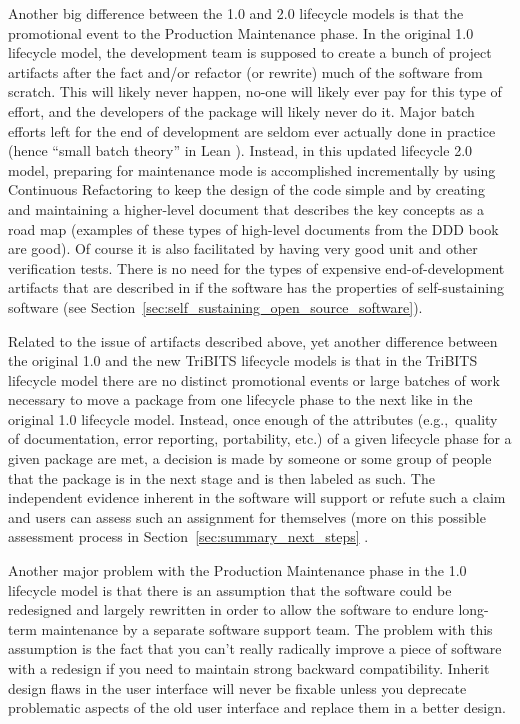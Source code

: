 \documentclass[11pt]{SANDreport}
\begin{document}
Another big difference between the 1.0 and 2.0 lifecycle models is
that the promotional event to the Production Maintenance phase.  In
the original 1.0 lifecycle model, the development team is supposed to
create a bunch of project artifacts after the fact and/or refactor (or
rewrite) much of the software from scratch.  This will likely never
happen, no-one will likely ever pay for this type of effort, and the
developers of the package will likely never do it.  Major batch
efforts left for the end of development are seldom ever actually done
in practice (hence ``small batch theory'' in Lean
{}\cite{ImplementingLeanSoftwareDevelopment}).  Instead, in this
updated lifecycle 2.0 model, preparing for maintenance mode is
accomplished incrementally by using Continuous Refactoring to keep
the design of the code simple and by creating and maintaining a
higher-level document that describes the key concepts as a road map
(examples of these types of high-level documents from the DDD book are
good).  Of course it is also facilitated by having very good unit and
other verification tests.  There is no need for the types of expensive
end-of-development artifacts that are described in
{}\cite{TrilinosLifecycleModel2007} if the software has the properties
of self-sustaining software (see
Section~\ref{sec:self_sustaining_open_source_software}).

Related to the issue of artifacts described above, yet another
difference between the original 1.0 and the new TriBITS lifecycle
models is that in the TriBITS lifecycle model there are no distinct
promotional events or large batches of work necessary to move a
package from one lifecycle phase to the next like in the original 1.0
lifecycle model.  Instead, once enough of the attributes (e.g.,\
quality of documentation, error reporting, portability, etc.) of a
given lifecycle phase for a given package are met, a decision is made
by someone or some group of people that the package is in the next
stage and is then labeled as such.  The independent evidence inherent
in the software will support or refute such a claim and users can
assess such an assignment for themselves (more on this possible
assessment process in Section~\ref{sec:summary_next_steps} .

Another major problem with the Production Maintenance phase in the 1.0
lifecycle model is that there is an assumption that the software could
be redesigned and largely rewritten in order to allow the software to
endure long-term maintenance by a separate software support team.  The
problem with this assumption is the fact that you can't really
radically improve a piece of software with a redesign if you need to
maintain strong backward compatibility.  Inherit design flaws in the
user interface will never be fixable unless you deprecate problematic
aspects of the old user interface and replace them in a better design.
\end{document}
